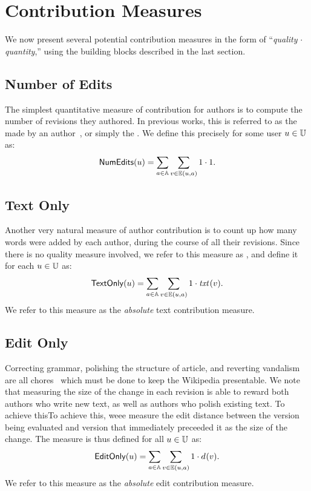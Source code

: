 \section{Contribution Measures}

We now present several potential contribution measures in the form of
``\textit{quality} $\cdot$ \textit{quantity},''
using the building blocks described in the last section.

\subsection{Number of Edits}

\noindent
The simplest quantitative measure of contribution for
authors is to compute the number of revisions they authored.
In previous works, this is referred to as the
 made by an
author~\cite{Wales2005,Wilkinson2007,Kittur2007,Stein2007},
or simply the .
We define this precisely
for some user $u \in \mathbb{U}$ as:
%
\[
\numedits(u) = \sum_{a \in \articles} \sum_{v \in \authorrevs{u, a}} 1 \cdot 1.
\]
%

\subsection{Text Only}

\noindent
Another very natural measure of author contribution
is to count up how many words were added by each author,
during the course of all their revisions.
Since there is no quality measure involved,
we refer to this measure as \textonly,
and define it for each $u \in \mathbb{U}$ as:
%
\[
\textonly(u) = \sum_{a \in \articles} \sum_{v \in \authorrevs{u, a}} 1 \cdot \txt{}{v}.
\]
%
We refer to this measure as the {\em absolute\/} text contribution
measure.

\subsection{Edit Only}

\noindent
Correcting grammar, polishing the structure of article,
and reverting vandalism are all chores~\cite{Burke2008}
which must be done to keep the Wikipedia presentable.
We note that measuring the size of the change
in each revision is able to reward both authors who write
new text, as well as authors who polish existing text.
To achieve thisTo achieve this, weee measure the edit distance between
the version  being evaluated and version 
that immediately preceeded it as the size of the change.
The \editonly measure is thus defined for all $u \in \mathbb{U}$ as:
%
\[
\editonly(u) = \sum_{a \in \articles} \sum_{v \in \authorrevs{u, a}} 1 \cdot \dist{}{v}.
\]
%
We refer to this measure as the {\em absolute\/} edit contribution
measure.

